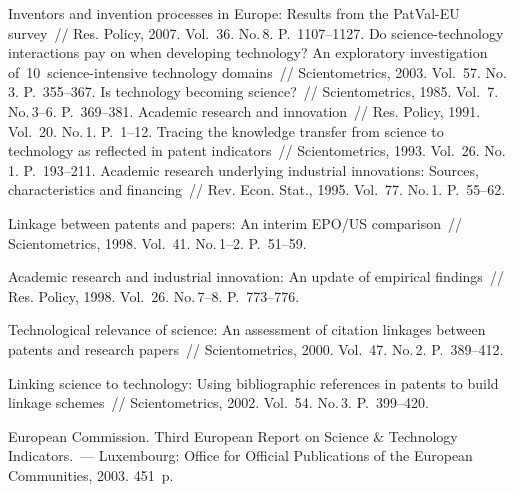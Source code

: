 \begin{multicols}{2}
{\small\frenchspacing
 {%
 \begin{thebibliography}{99}
 Inventors 
and invention processes in Europe: Results from the PatVal-EU survey~// Res. Policy, 2007. 
Vol.~36. No.\,8. P.~1107--1127.
 Do 
science-technology interactions pay on when developing technology? An exploratory investigation 
of~10~science-intensive technology domains~// Scientometrics, 2003. Vol.~57. No.\,3.  
P.~355--367.
 Is technology becoming science?~// Scientometrics, 1985. Vol.~7.  
No.\,3--6. P.~369--381.
 Academic research and innovation~// Res. Policy, 1991. Vol.~20. No.\,1. 
P.~1--12.
 Tracing the knowledge transfer from science to technology as reflected in patent 
indicators~// Scientometrics, 1993. Vol.~26. No.\,1. P.~193--211.
 Academic research underlying industrial innovations: Sources, characteristics 
and financing~// Rev. Econ. Stat., 1995. Vol.~77. No.\,1. P.~55--62.

 Linkage between patents and papers: An interim EPO/US 
comparison~// Scientometrics, 1998. Vol.~41. No.\,1--2. P.~51--59.


 Academic research and industrial innovation: An update of empirical findings~// 
Res. Policy, 1998. Vol.~26. No.\,7--8. P.~773--776.

Technological relevance of science: An 
assessment of citation linkages between patents and research papers~// Scientometrics, 2000. 
Vol.~47. No.\,2. P.~389--412.

 Linking 
science to technology: Using bibliographic references in patents to build linkage schemes~// 
Scientometrics, 2002. Vol.~54. No.\,3. P.~399--420.

European Commission. Third European Report on Science \& Technology Indicators.~--- 
Luxembourg: Office for Official Publications of the European Communities, 2003. 451~p.


\end{thebibliography}}}
\end{multicols}

